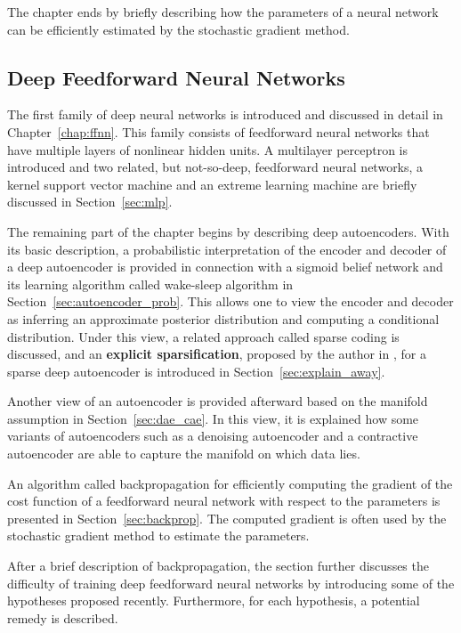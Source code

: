 \documentclass[dissertation,nocontribution]{aaltoseries}
\begin{document}
The chapter ends by briefly describing how the
parameters of a neural network can be efficiently estimated
by the stochastic gradient method.

\subsection{Deep Feedforward Neural Networks}

The first family of deep neural networks is introduced and
discussed in detail in Chapter~\ref{chap:ffnn}. This family
consists of feedforward neural networks that have multiple
layers of nonlinear hidden units.  A multilayer
perceptron is introduced and two related, but not-so-deep,
feedforward neural networks, a kernel support
vector machine and an extreme learning machine are
briefly discussed in Section~\ref{sec:mlp}.

The remaining part of the chapter begins by describing
deep autoencoders. With its basic description, a
probabilistic interpretation of the encoder and decoder of a
deep autoencoder is provided in connection with a
sigmoid belief network and its learning algorithm
called wake-sleep algorithm in
Section~\ref{sec:autoencoder_prob}. This allows one to view
the encoder and decoder as inferring an approximate
posterior distribution and computing a conditional
distribution. Under this view, a related approach called
sparse coding is discussed, and an
\textbf{explicit sparsification}, proposed by the
author in , for a sparse deep
autoencoder is introduced in Section~\ref{sec:explain_away}.

Another view of an autoencoder is provided afterward based
on the manifold assumption in Section~\ref{sec:dae_cae}. In
this view, it is explained how some variants of autoencoders
such as a denoising autoencoder and a
contractive autoencoder are able to capture the
manifold on which data lies. 

An algorithm called backpropagation for efficiently computing the
gradient of the cost function of a feedforward neural network
with respect to the parameters is presented in
Section~\ref{sec:backprop}. The computed gradient is often used
by the stochastic gradient method to estimate the parameters.

After a brief description of backpropagation, the section further
discusses the difficulty of training deep feedforward neural
networks by introducing some of the hypotheses proposed recently.
Furthermore, for each hypothesis, a potential remedy is
described.
\end{document}
